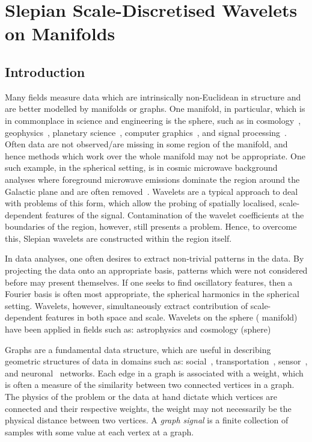 \chapter{Slepian Scale-Discretised Wavelets on Manifolds}\label{sec:chapter4}

\section{Introduction}

Many fields measure data which are intrinsically non-Euclidean in structure and are better modelled by manifolds or graphs.
One manifold, in particular, which is in commonplace in science and engineering is the sphere, such as in cosmology~\cite{Bennett1996}, geophysics~\cite{Simons2006}, planetary science~\cite{Turcotte1981}, computer graphics~\cite{Ramamoorthi2004}, and signal processing~\cite{Roddy2021a}.
Often data are not observed/are missing in some region of the manifold, and hence methods which work over the whole manifold may not be appropriate.
One such example, in the spherical setting, is in cosmic microwave background analyses where foreground microwave emissions dominate the region around the  Galactic plane and are often removed~\cite{Mortlock2002}.
Wavelets are a typical approach to deal with problems of this form, which allow the probing of spatially localised, scale-dependent features of the signal.
Contamination of the wavelet coefficients at the boundaries of the region, however, still presents a problem.
Hence, to overcome this, Slepian wavelets are constructed within the region itself.

In data analyses, one often desires to extract non-trivial patterns in the data.
By projecting the data onto an appropriate basis, patterns which were not considered before may present themselves.
If one seeks to find oscillatory features, then a Fourier basis is often most appropriate, \ie{} the spherical harmonics in the spherical setting.
Wavelets, however, simultaneously extract contribution of scale-dependent features in both space and scale.
Wavelets on the sphere (\cf{} manifold) have been applied in fields such as: astrophysics and cosmology (sphere)~\cite{Pen1999,Barreiro2001,Rocha2004,McEwen2004}

Graphs are a fundamental data structure, which are useful in describing geometric structures of data in domains such as: social~\cite{Nettleton2013}, transportation~\cite{Mohan2014}, sensor~\cite{Kenniche2010}, and neuronal~\cite{Tang2012} networks.
Each edge in a graph is associated with a weight, which is often a measure of the similarity between two connected vertices in a graph.
The physics of the problem or the data at hand dictate which vertices are connected and their respective weights, \ie{} the weight may not necessarily be the physical distance between two vertices.
A \emph{graph signal} is a finite collection of samples with some value at each vertex at a graph.

